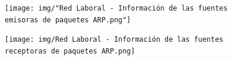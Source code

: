 \begin{figure}[h!]
    \centering                                                       
    \texttt{[image: img/"Red Laboral - Información de las fuentes emisoras de paquetes ARP.png"]}
    \caption{}
    \label{laboral:emisoras}
\end{figure}

\begin{figure}[h!]
    \centering                                                       
    \texttt{[image: img/Red Laboral - Información de las fuentes receptoras de paquetes ARP.png]}
    \caption{}
    \label{laboral:receptoras}
\end{figure}


